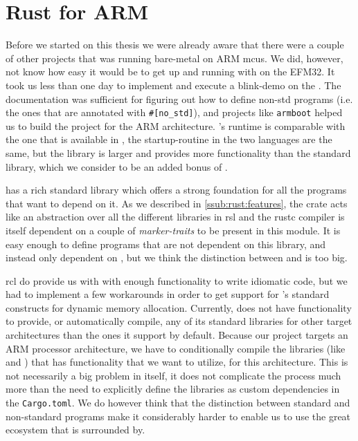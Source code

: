 
\section{Rust for ARM} %
\label{sec:rust_for_arm}

Before we started on this thesis we were already aware that there were a couple of other projects that was running {\rust} bare-metal on ARM \glspl{mcu}.
We did, however, not know how easy it would be to get up and running with {\rust} on the EFM32.
It took us less than one day to implement and execute a {\rust} blink-demo on the {\STK}.
The {\rust} documentation was sufficient for figuring out how to define non-std {\rust} programs (i.e. the ones that are annotated with \texttt{\#[no\_std]}), and projects like \texttt{armboot} helped us to build the project for the ARM architecture.
{\rust}'s runtime is comparable with the one that is available in {\C}, the startup-routine in the two languages are the same, but the {\core} library is larger and provides more functionality than the {\C} standard library, which we consider to be an added bonus of {\rust}.

{\rust} has a rich standard library which offers a strong foundation for all the programs that want to depend on it.
As we described in \autoref{ssub:rust:features}, the {\std} crate acts like an abstraction over all the different libraries in \gls{rsl} and the rustc compiler is itself dependent on a couple of \emph{marker-traits} to be present in this module.
It is easy enough to define programs that are not dependent on this {\std} library, and instead only dependent on {\core}, but we think the distinction between {\std} and {\core} is too big.

\gls{rcl} do provide us with with enough functionality to write idiomatic {\rust} code, but we had to implement a few workarounds in order to get support for {\rust}'s standard constructs for dynamic memory allocation.
Currently, {\rust} does not have functionality to provide, or automatically compile, any of its standard libraries for other target architectures than the ones it support by default.
Because our project targets an ARM processor architecture, we have to conditionally compile the libraries (like  and ) that has functionality that we want to utilize, for this architecture.
This is not necessarily a big problem in itself, it does not complicate the process much more than the need to explicitly define the libraries as custom dependencies in the \texttt{Cargo.toml}.
We do however think that the distinction between standard and non-standard programs make it considerably harder to enable us to use the great ecosystem that {\rust} is surrounded by.

